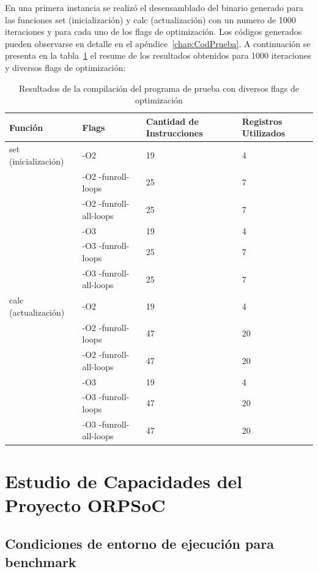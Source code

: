 En una primera instancia se realizó el desensamblado del binario generado para las funciones set (inicialización) y calc (actualización) con un
numero de 1000 iteraciones y para cada uno de los flags de optimización. Los códigos generados pueden observarse en detalle en el apéndice~\ref{chap:CodPrueba}. 
\newpage		
A continuación se presenta en la tabla~\ref{tab:conbench2} el resume de los resultados obtenidos para 1000 iteraciones y diversos flags de optimización:

\begin{table}[!h]
		\centering
		\begin{tabular}{ | p{4cm} | p{5cm} | p{2.5cm} | p{2cm} | }
		\hline 
		\rowcolor[gray]{0.8} Función & Flags & Cantidad de Instrucciones  & Registros Utilizados \\    
		\hline 
		set (inicialización) 	& -O2 						& 19 &  4 \\ 
		\hline 
							 	& -O2 -funroll-loops 		& 25 &  7 \\ 
		\hline 
							 	& -O2 -funroll-all-loops 	& 25 &  7 \\ 
		\hline 
							 	& -O3 						& 19 &  4 \\ 
		\hline 
							 	& -O3 -funroll-loops 		& 25 &  7 \\ 
		\hline 
							 	& -O3 -funroll-all-loops 	& 25 &  7 \\ 
		\hline 
		calc (actualización) 	& -O2						& 19 &  4 \\ 
		\hline 
							 	& -O2 -funroll-loops 		& 47 &  20 \\ 
		\hline 
							 	& -O2 -funroll-all-loops 	& 47 &  20 \\ 		
		\hline					 	
							 	& -O3 						& 19 &  4 \\ 
		\hline 
							 	& -O3 -funroll-loops 		& 47 &  20 \\ 
		\hline 
							 	& -O3 -funroll-all-loops 	& 47 &  20 \\ 		
		\hline 
		\end{tabular}
\caption{Resultados de la compilación del programa de prueba con diversos flags de optimización}
\label{tab:conbench2}
\end{table}	


\section {Estudio de Capacidades del Proyecto ORPSoC}	
		\subsection{Condiciones de entorno de ejecución para benchmark}
		
